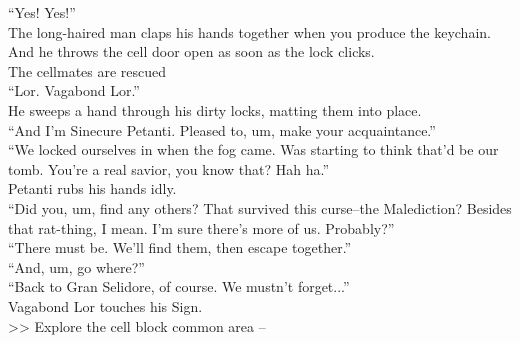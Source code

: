 “Yes! Yes!”\\

The long-haired man claps his hands together when you produce the keychain. And he throws the cell door open as soon as the lock clicks.\\
 The cellmates are rescued\\

“Lor. Vagabond Lor.”\\
He sweeps a hand through his dirty locks, matting them into place.\\

“And I’m Sinecure Petanti. Pleased to, um, make your acquaintance.”\\

“We locked ourselves in when the fog came. Was starting to think that’d be our tomb. You’re a real savior, you know that? Hah ha.”\\

Petanti rubs his hands idly.\\
“Did you, um, find any others? That survived this curse--the Malediction? Besides that rat-thing, I mean. I’m sure there’s more of us. Probably?”\\

“There must be. We’ll find them, then escape together.”\\

“And, um, go where?”\\

“Back to Gran Selidore, of course. We mustn’t forget...”\\

Vagabond Lor touches his Sign.\\

>> Explore the cell block common area -- 